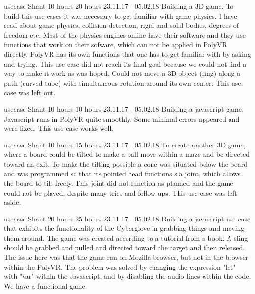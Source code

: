 	{usecase}%
	{Shant} %
	{10 hours} %
	{20 hours} %
	{23.11.17 - 05.02.18} %
	{Building a 3D game.}%
	{To build this use-cases it was necessary to get familiar with game physics. I have read about game physics, collision detection, rigid and solid bodies, degrees of freedom etc. Most of the physics engines online have their software and they use functions that work on their sofware, which can not be applied in PolyVR directly. PolyVR has its own functions that one has to get familiar with by asking and trying. This use-case did not reach its final goal because we could not find a way to make it work as was hoped. Could not move a 3D object (ring) along  a path (curved tube) with simultaneous rotation around its own center.}%
	{This use-case was left out.}%

	{usecase}%
	{Shant} %
	{10 hours} %
	{10 hours} %
	{23.11.17 - 05.02.18} %
	{Building a javascript game.}%
	{Javascript runs in PolyVR quite smoothly. Some minimal errors appeared and were fixed.}%
	{This use-case works well.}%
	
	{usecase}%
	{Shant} %
	{10 hours} %
	{15 hours} %
	{23.11.17 - 05.02.18} %
	{To create another 3D game, where a board could be tilted to make a ball move within a maze and be directed toward an exit.}%
	{To make the tilting possible a cone was situated below the board and was programmed so that its pointed head functions s a joint, which allows the board to tilt freely. This joint did not function as planned and the game could not be played, despite many tries and follow-ups.}%
	{This use-case was left aside.}%

	{usecase}%
	{Shant} %
	{20 hours} %
	{25 hours} %
	{23.11.17 - 05.02.18} %
	{Building a javascript use-case that exhibits the functionality of the Cyberglove in grabbing things and moving them around. The game was  created according to a tutorial from a book. A sling should be grabbed and pulled and directed toward the target and then released.}%
	{The issue here was that the game ran on Mozilla browser, but not in the browser within the PolyVR. The problem was solved by changing the expression "let" with "var" within the Javascript, and by disabling the audio lines within the code.}%
	{We have a functional game.}%

